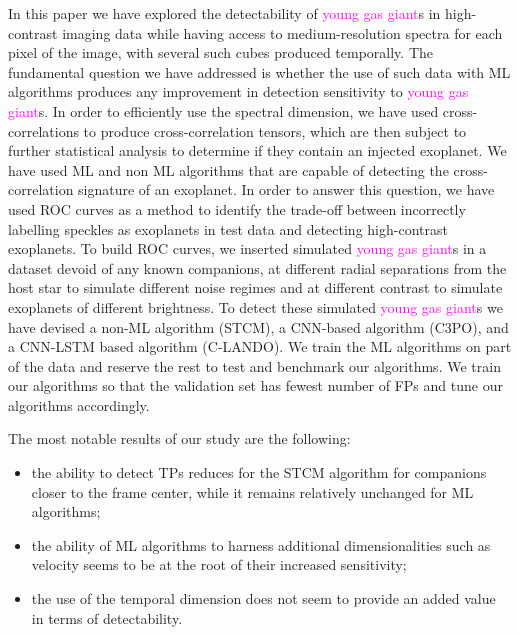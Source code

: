 \documentclass[referee]{aa} %
\newcommand{\newchange}[1]{\textcolor{magenta}{#1}}
\begin{document}
In this paper we have explored the detectability of \newchange{young gas giant}s in high-contrast imaging data while having access to medium-resolution spectra for each pixel of the image, with several such cubes produced temporally.
The fundamental question we have addressed is whether the use of such data with ML algorithms produces any improvement in detection sensitivity to \newchange{young gas giant}s.
In order to efficiently use the spectral dimension, we have used cross-correlations to produce cross-correlation tensors, which are then subject to further statistical analysis to determine if they contain an injected exoplanet.
We have used ML and non ML algorithms that are capable of detecting the cross-correlation signature of an exoplanet. %
In order to answer this question, we have used ROC curves as a method to identify the trade-off between incorrectly labelling speckles as exoplanets in test data and detecting high-contrast exoplanets.
To build ROC curves, we inserted simulated \newchange{young gas giant}s in a dataset devoid of any known companions, at different radial separations from the host star to simulate different noise regimes and at different contrast to simulate exoplanets of different brightness.
To detect these simulated \newchange{young gas giant}s we have devised a non-ML algorithm (STCM), a CNN-based algorithm (C3PO), and a CNN-LSTM based algorithm (C-LANDO). 
We train the ML algorithms on part of the data and reserve the rest to test and benchmark our algorithms. 
We train our algorithms so that the validation set has fewest number of FPs and tune our algorithms accordingly. 

The most notable results of our study are the following:
\begin{itemize}
    \item the ability to detect TPs reduces for the STCM algorithm for companions closer to the frame center, while it remains relatively unchanged for ML algorithms;
    \item the ability of ML algorithms to harness additional dimensionalities such as velocity seems to be at the root of their increased sensitivity;
    \item the use of the temporal dimension does not seem to provide an added value in terms of detectability.%
\end{itemize}
\end{document}
